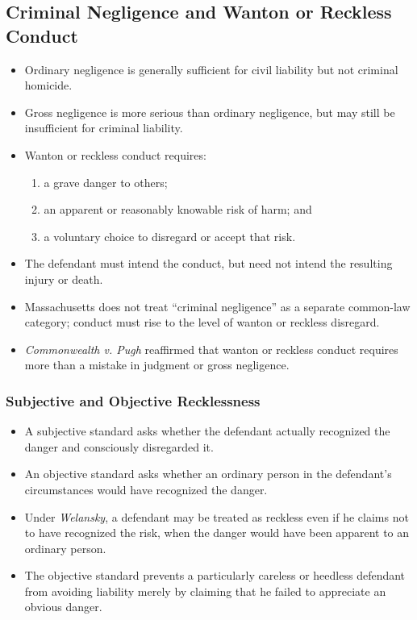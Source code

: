 \documentclass[11pt]{tex/lawoutline}
\begin{document}
\subsection{Criminal Negligence and Wanton or Reckless Conduct}
{
\begin{itemize}
    \item Ordinary negligence is generally sufficient for civil liability but not criminal homicide.
    \item Gross negligence is more serious than ordinary negligence, but may still be insufficient for criminal liability.
    \item Wanton or reckless conduct requires:
    \begin{enumerate}
        \item a grave danger to others;
        \item an apparent or reasonably knowable risk of harm; and
        \item a voluntary choice to disregard or accept that risk.
    \end{enumerate}
    \item The defendant must intend the conduct, but need not intend the resulting injury or death.
    \item Massachusetts does not treat ``criminal negligence'' as a separate common-law category; conduct must rise to the level of wanton or reckless disregard.
    \item \textit{Commonwealth v. Pugh} reaffirmed that wanton or reckless conduct requires more than a mistake in judgment or gross negligence.
\end{itemize}
}

\subsubsection{Subjective and Objective Recklessness}
{
\begin{itemize}
    \item A subjective standard asks whether the defendant actually recognized the danger and consciously disregarded it.
    \item An objective standard asks whether an ordinary person in the defendant's circumstances would have recognized the danger.
    \item Under \textit{Welansky}, a defendant may be treated as reckless even if he claims not to have recognized the risk, when the danger would have been apparent to an ordinary person.
    \item The objective standard prevents a particularly careless or heedless defendant from avoiding liability merely by claiming that he failed to appreciate an obvious danger.
\end{itemize}
}
\end{document}
